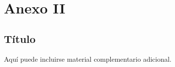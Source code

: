 \chapter{Anexo II}
\label{anexo2}

\section*{Título}

Aquí puede incluirse material complementario adicional.